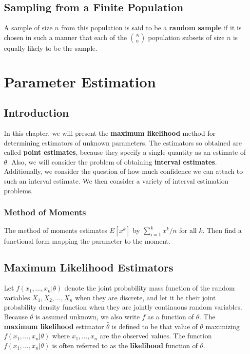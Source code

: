 \documentclass[12pt]{article}
\begin{document}
\subsection{Sampling from a Finite Population}

A sample of size $n$ from this population is said to be a \textbf{random sample} if it is chosen in such a manner that each of the $\binom {N}{n}$ population subsets of size $n$ is equally likely to be the sample.


\section{Parameter Estimation}

\subsection{Introduction}

In this chapter, we will present the \textbf{maximum likelihood} method for determining estimators of unknown parameters. The estimators so obtained are called \textbf{point estimates}, because they specify a single quantity as an estimate of $\theta$. Also, we will consider the problem of obtaining \textbf{interval estimates}. Additionally, we consider the question of how much confidence we can attach to such an interval estimate. We then consider a variety of interval estimation problems.

\subsubsection{Method of Moments}

The method of moments estimates $E[x^k]$ by $\sum_{i=1}^k x^k/n$ for all $k$. Then find a functional form mapping the parameter to the moment.

\subsection{Maximum Likelihood Estimators}

Let $f(x_1, \dots, x_n | \theta)$ denote the joint probability mass function of the random variables $X_1, X_2, \dots, X_n$ when they are discrete, and let it be their joint probability density function when they are jointly continuous random variables. Because $\theta$ is assumed unknown, we also write $f$ as a function of $\theta$. The \textbf{maximum likelihood} estimator $\hat{\theta}$ is defined to be that value of $\theta$ maximizing $f(x_1, \dots, x_n | \theta)$ where $x_1, \dots, x_n$ are the observed values. The function $f(x_1, \dots, x_n | \theta)$ is often referred to as the \textbf{likelihood} function of $\theta$.
\end{document}
